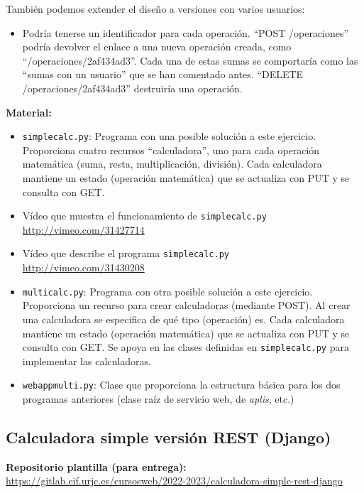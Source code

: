 También podemos extender el diseño a versiones con varios usuarios:

\begin{itemize}
\item Podría tenerse un identificador para cada operación. ``POST /operaciones'' podría devolver el enlace a una nueva operación creada, como ``/operaciones/2af434ad3''. Cada una de estas sumas se comportaría como las ``sumas con un usuario'' que se han comentado antes. ``DELETE  /operaciones/2af434ad3'' destruiría una operación.
\end{itemize}

\textbf{Material:}

\begin{itemize}
\item \texttt{simplecalc.py}: Programa con una posible solución a este ejercicio. Proporciona cuatro recursos ``calculadora'', uno para cada operación matemática (suma, resta, multiplicación, división). Cada calculadora mantiene un estado (operación matemática) que se actualiza con PUT y se consulta con GET.
\item Vídeo que muestra el funcionamiento de \texttt{simplecalc.py} \\
  \url{http://vimeo.com/31427714}
\item Vídeo que describe el programa \texttt{simplecalc.py} \\
  \url{http://vimeo.com/31430208}
\item \texttt{multicalc.py}: Programa con otra posible solución a este ejercicio. Proporciona un recurso para crear calculadoras (mediante POST). Al crear una calculadora se especifica de qué tipo (operación) es. Cada calculadora mantiene un estado (operación matemática) que se actualiza con PUT y se consulta con GET. Se apoya en las clases definidas en \texttt{simplecalc.py} para implementar las calculadoras.
\item \texttt{webappmulti.py}: Clase que proporciona la estructura básica para los dos programas anteriores (clase raíz de servicio web, de \emph{aplis}, etc.)
\end{itemize}

\subsection{Calculadora simple versión REST (Django)}
\label{subsec:calc-simple-rest-django}

\textbf{Repositorio plantilla (para entrega):} \\
\url{https://gitlab.eif.urjc.es/cursosweb/2022-2023/calculadora-simple-rest-django}

